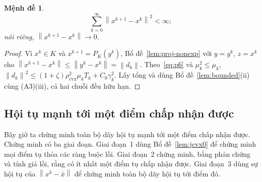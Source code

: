 \documentclass[]{interact}
\theoremstyle{plain}
\newtheorem{proposition}[theorem]{Mệnh đề}
\theoremstyle{definition}
\theoremstyle{remark}
\newcommand{\norm}[1]{\left\lVert #1 \right\rVert}
\newcommand{\cvx}{\mathrm{cvx}}
\begin{document}
\begin{proposition}\label{prop:regularity}
\[
\sum_{k=0}^{\infty}\norm{x^{k+1}-x^k}^{2}<\infty;
\]
nói riêng,
$\norm{x^{k+1}-x^k}\to0$.
\end{proposition}
\begin{proof}
Vì $x^k\in K$ và $x^{k+1}=P_K(y^k)$, Bổ đề~\ref{lem:proj-nonexp} với $y=y^k$, $z=x^k$
cho $\norm{x^{k+1}-x^k}\le\norm{y^k-x^k}=\norm{d_k}$. Theo~\eqref{eq:p6} và
$\mu_k^2\le\mu_k$, $\norm{d_k}^2\le(1+\zeta)\rho_{\cvx}^2\mu_k T_k+C_0\gamma_k^2$.
Lấy tổng và dùng Bổ đề~\ref{lem:bounded}(ii) cùng (A3)(iii), cả hai chuỗi đều hữu hạn.
\end{proof}

\subsection{Hội tụ mạnh tới một điểm chấp nhận được}\label{ssec:strong}
Bây giờ ta chứng minh toàn bộ dãy hội tụ mạnh tới một điểm chấp nhận được. Chứng minh có ba
giai đoạn. Giai đoạn~1 dùng Bổ đề~\ref{lem:jcvx0} để chứng minh mọi điểm tụ thỏa các
ràng buộc lồi. Giai đoạn~2 chứng minh, bằng phản chứng và tính giả lồi, rằng có ít nhất một
điểm tụ chấp nhận được. Giai đoạn~3 dùng sự hội tụ của $\norm{x^k-\bar x}$ để chứng minh
toàn bộ dãy hội tụ tới điểm đó.
\end{document}
